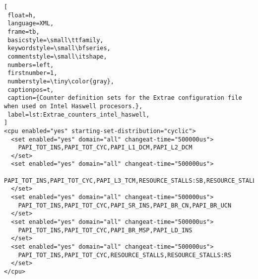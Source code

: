 \begin{lstlisting}[
 float=h,
 language=XML,
 frame=tb,
 basicstyle=\small\ttfamily,
 keywordstyle=\small\bfseries,
 commentstyle=\small\itshape,
 numbers=left,
 firstnumber=1,
 numberstyle=\tiny\color{gray},
 captionpos=t,
 caption={Counter definition sets for the Extrae configuration file when used on Intel Haswell procesors.},
 label=lst:Extrae_counters_intel_haswell,
]
<cpu enabled="yes" starting-set-distribution="cyclic">
  <set enabled="yes" domain="all" changeat-time="500000us">
    PAPI_TOT_INS,PAPI_TOT_CYC,PAPI_L1_DCM,PAPI_L2_DCM
  </set>
  <set enabled="yes" domain="all" changeat-time="500000us">
    PAPI_TOT_INS,PAPI_TOT_CYC,PAPI_L3_TCM,RESOURCE_STALLS:SB,RESOURCE_STALLS:ROB
  </set>
  <set enabled="yes" domain="all" changeat-time="500000us">
    PAPI_TOT_INS,PAPI_TOT_CYC,PAPI_SR_INS,PAPI_BR_CN,PAPI_BR_UCN
  </set>
  <set enabled="yes" domain="all" changeat-time="500000us">
    PAPI_TOT_INS,PAPI_TOT_CYC,PAPI_BR_MSP,PAPI_LD_INS
  </set>
  <set enabled="yes" domain="all" changeat-time="500000us">
    PAPI_TOT_INS,PAPI_TOT_CYC,RESOURCE_STALLS,RESOURCE_STALLS:RS
  </set>
</cpu>
\end{lstlisting}
